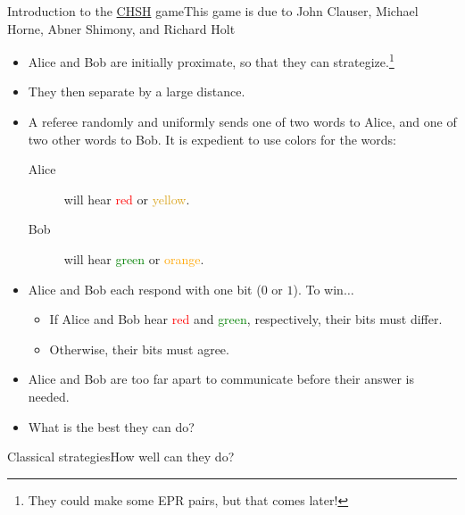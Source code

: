 {%
\def\Red{Red}\def\Yellow{Goldenrod}\def\Green{green}\def\Orange{orange}%
\def\RD#1{\textcolor{\Red}{#1}}
\def\YL#1{\textcolor{\Yellow}{#1}}
\def\GN#1{\textcolor{\Green}{#1}}
\def\OR#1{\textcolor{\Orange}{#1}}
\begin{frame}{Introduction to the \href{https://en.wikipedia.org/wiki/CHSH_game}{CHSH} game}{This game is due to John Clauser, Michael Horne, Abner Shimony, and Richard Holt}
    \begin{itemize}[<+->]
        \item Alice and Bob are initially proximate, so that they can strategize.\footnote{They could make some EPR pairs, but that comes later!}
        \item They then separate by a large distance.
        \item A referee randomly and uniformly sends one of two words to Alice, and one of two other words to Bob.  It is expedient to use colors for the words:
        \begin{description}
            \item[Alice] will hear \RD{red} or \YL{yellow}.
            \item[Bob] will hear \GN{green} or \OR{orange}.
        \end{description}
    \item Alice and Bob each respond with one bit ($0$ or $1$).  To win$\ldots$
    \begin{itemize}
        \item If Alice and Bob hear \RD{red} and \GN{green}, respectively, their bits must differ.
        \item Otherwise, their bits must agree.
    \end{itemize}
    \item Alice and Bob are too far apart to communicate before their answer is needed.
    \item What is the best they can do?
    \end{itemize}
\end{frame}%

\begin{frame}{Classical strategies}{How well can they do?}


\end{frame}}

